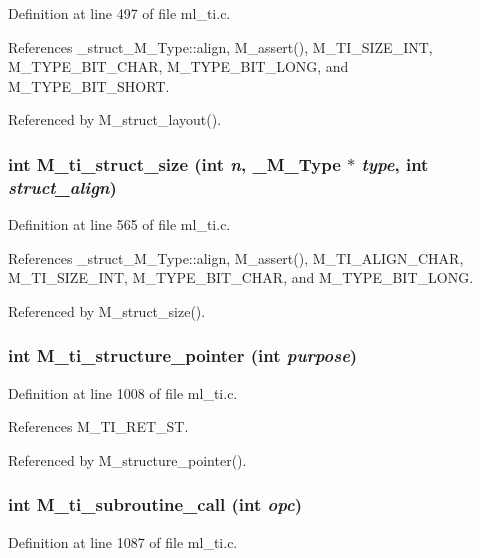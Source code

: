 Definition at line 497 of file ml\_\-ti.c.

References \_\-struct\_\-M\_\-Type::align, M\_\-assert(), M\_\-TI\_\-SIZE\_\-INT, M\_\-TYPE\_\-BIT\_\-CHAR, M\_\-TYPE\_\-BIT\_\-LONG, and M\_\-TYPE\_\-BIT\_\-SHORT.

Referenced by M\_\-struct\_\-layout().
\subsubsection{\setlength{\rightskip}{0pt plus 5cm}int M\_\-ti\_\-struct\_\-size (int {\em n}, \bf{\_\-M\_\-Type} $\ast$ {\em type}, int {\em struct\_\-align})}\label{m__ti_8h_06ed7bba2d8d5b01dd68e2d020f101b5}




Definition at line 565 of file ml\_\-ti.c.

References \_\-struct\_\-M\_\-Type::align, M\_\-assert(), M\_\-TI\_\-ALIGN\_\-CHAR, M\_\-TI\_\-SIZE\_\-INT, M\_\-TYPE\_\-BIT\_\-CHAR, and M\_\-TYPE\_\-BIT\_\-LONG.

Referenced by M\_\-struct\_\-size().
\subsubsection{\setlength{\rightskip}{0pt plus 5cm}int M\_\-ti\_\-structure\_\-pointer (int {\em purpose})}\label{m__ti_8h_48bbc2be514120d89b28c04379fb68cb}




Definition at line 1008 of file ml\_\-ti.c.

References M\_\-TI\_\-RET\_\-ST.

Referenced by M\_\-structure\_\-pointer().
\subsubsection{\setlength{\rightskip}{0pt plus 5cm}int M\_\-ti\_\-subroutine\_\-call (int {\em opc})}\label{m__ti_8h_21818721d762b5b5f51f7d7988e9f59f}




Definition at line 1087 of file ml\_\-ti.c.

